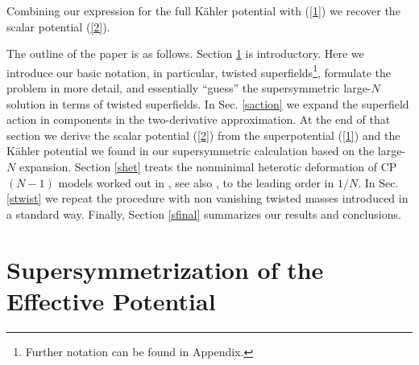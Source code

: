 \documentclass[epsfig,12pt]{article}
\begin{document}
	Combining our expression for the full  K\"ahler potential with (\ref{1}) we recover the scalar potential (\ref{2}). 

	The outline of the paper is as follows. 
	Section \ref{ssuper} is introductory.
	Here we introduce our basic notation, in particular, 
	twisted superfields\footnote{Further notation can be found in Appendix.}, formulate the problem in more detail, 
	and essentially ``guess'' the supersymmetric large-$N$ solution in terms of twisted superfields.
	In Sec. \ref{saction} we expand the superfield action in components in the two-derivative approximation.
	At the end of that section we derive the scalar potential (\ref{2}) from the superpotential (\ref{1}) 
	and the K\"ahler potential we found in our supersymmetric calculation based on the large-$N$ expansion.
	Section \ref{shet} treats the nonminimal heterotic deformation of CP$(N-1)$ models worked out in \cite{EdTo,SY1}, 
	see also \cite{SYhet,BSYhet,BSY1}, to the leading order in $1/N$. 
	In Sec. \ref{stwist} we repeat the procedure with non vanishing twisted masses introduced in a standard way. 
	Finally, Section \ref{sfinal} summarizes our results and conclusions.


\section{Supersymmetrization of the Effective Potential}
\label{ssuper}
\end{document}
